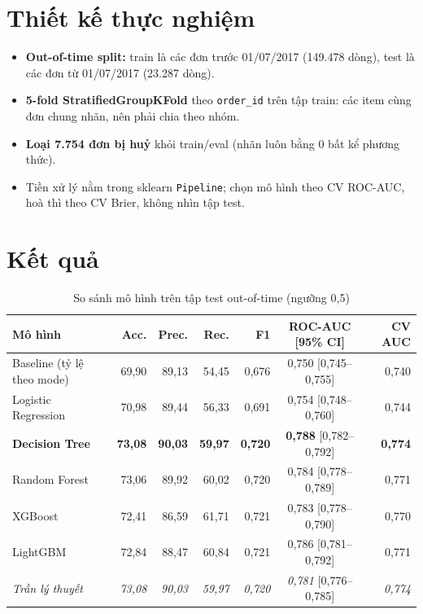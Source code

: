 \section{Thiết kế thực nghiệm}
\begin{itemize}
  \item \textbf{Out-of-time split:} train là các đơn trước 01/07/2017 (149.478 dòng), test là các đơn từ 01/07/2017 (23.287 dòng).
  \item \textbf{5-fold StratifiedGroupKFold} theo \texttt{order\_id} trên tập train: các item cùng đơn chung nhãn, nên phải chia theo nhóm.
  \item \textbf{Loại 7.754 đơn bị huỷ} khỏi train/eval (nhãn luôn bằng 0 bất kể phương thức).
  \item Tiền xử lý nằm trong sklearn \texttt{Pipeline}; chọn mô hình theo CV ROC-AUC, hoà thì theo CV Brier, không nhìn tập test.
\end{itemize}

\section{Kết quả}
\begin{table}[H]
\centering
\caption{So sánh mô hình trên tập test out-of-time (ngưỡng 0,5)}
\label{tab:model-cmp}
\small
\begin{tabular}{lrrrrcr}
\toprule
\textbf{Mô hình} & \textbf{Acc.} & \textbf{Prec.} & \textbf{Rec.} & \textbf{F1} & \textbf{ROC-AUC [95\% CI]} & \textbf{CV AUC} \\ \midrule
Baseline (tỷ lệ theo mode) & 69,90 & 89,13 & 54,45 & 0,676 & 0,750 [0,745--0,755] & 0,740 \\
Logistic Regression        & 70,98 & 89,44 & 56,33 & 0,691 & 0,754 [0,748--0,760] & 0,744 \\
\textbf{Decision Tree}     & \textbf{73,08} & \textbf{90,03} & \textbf{59,97} & \textbf{0,720} & \textbf{0,788} [0,782--0,792] & \textbf{0,774} \\
Random Forest              & 73,06 & 89,92 & 60,02 & 0,720 & 0,784 [0,778--0,789] & 0,771 \\
XGBoost                    & 72,41 & 86,59 & 61,71 & 0,721 & 0,783 [0,778--0,790] & 0,770 \\
LightGBM                   & 72,84 & 88,47 & 60,84 & 0,721 & 0,786 [0,781--0,792] & 0,771 \\ \midrule
\textit{Trần lý thuyết}    & \textit{73,08} & \textit{90,03} & \textit{59,97} & \textit{0,720} & \textit{0,781} [0,776--0,785] & \textit{0,774} \\
\bottomrule
\end{tabular}
\end{table}

